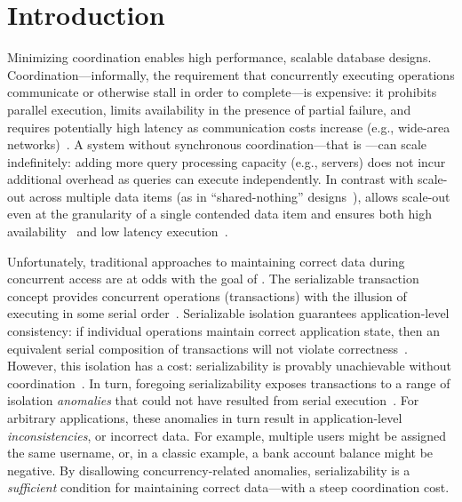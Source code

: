 
\section{Introduction}
\label{sec:intro}


Minimizing coordination enables high performance, scalable database
designs. Coordination---informally, the requirement that concurrently
executing operations communicate or otherwise stall in order to
complete---is expensive: it prohibits parallel execution, limits
availability in the presence of partial failure, and requires
potentially high latency as communication costs increase (e.g.,
wide-area networks)~\cite{hat-vldb,gilbert-cap}. A system without
synchronous coordination---that is \textit{\cfree}---can scale
indefinitely: adding more query processing capacity (e.g., servers)
does not incur additional overhead as queries can execute
independently. In contrast with scale-out across multiple data items
(as in ``shared-nothing''
designs~\cite{bernstein-book,f1,spanner,pnuts,hstore}), \cfreedom
allows scale-out even at the granularity of a single contended data
item and ensures both high availability~\cite{gilbert-cap} and low
latency execution~\cite{pacelc}.


Unfortunately, traditional approaches to maintaining correct data
during concurrent access are at odds with the goal of \cfreedom. The
serializable transaction concept provides concurrent operations
(transactions) with the illusion of executing in some serial
order~\cite{bernstein-book}. Serializable isolation guarantees
application-level consistency: if individual operations maintain
correct application state, then an equivalent serial composition of
transactions will not violate
correctness~\cite{gray-virtues}. However, this isolation has a cost:
serializability is provably unachievable without
coordination~\cite{hat-vldb,davidson-survey}. In turn, foregoing
serializability exposes transactions to a range of isolation
\textit{anomalies} that could not have resulted from serial
execution~\cite{adya-isolation}. For arbitrary applications, these
anomalies in turn result in application-level
\textit{inconsistencies}, or incorrect data. For example, multiple
users might be assigned the same username, or, in a classic example, a
bank account balance might be negative. By disallowing
concurrency-related anomalies, serializability is a
\textit{sufficient} condition for maintaining correct data---with a
steep coordination cost.

